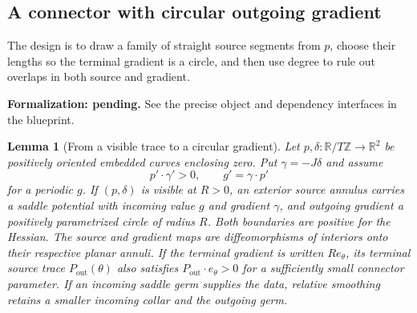 \documentclass[11pt]{amsart}
\newtheorem{lemma}[theorem]{Lemma}
\theoremstyle{definition}
\theoremstyle{remark}
\newcommand{\R}{\mathbb R}\newcommand{\Sph}{\mathbb S}
\numberwithin{equation}{section}
\begin{document}
\subsection{A connector with circular outgoing gradient}
The design is to draw a family of straight source segments from $p$,
choose their lengths so the terminal gradient is a circle, and then use
degree to rule out overlaps in both source and gradient.
\par\noindent\textbf{Formalization: pending.} See the precise object and dependency interfaces in the blueprint.\par
\begin{lemma}[From a visible trace to a circular gradient]\label{lem:connector}
Let $p,\delta:\R/T\mathbb Z\to\R^2$ be positively oriented embedded
curves enclosing zero. Put $\gamma=-J\delta$ and assume
\begin{equation}\label{eq:connector-data}
 p'\cdot\gamma'>0,\qquad g'=\gamma\cdot p'
\end{equation}
for a periodic $g$. If $(p,\delta)$ is visible at $R>0$, an exterior
source annulus carries a saddle potential with incoming value $g$ and
gradient $\gamma$, and outgoing gradient a positively parametrized
circle of radius $R$. Both boundaries are positive for the Hessian.
The source and gradient maps are diffeomorphisms of interiors onto their
respective planar annuli. If the terminal gradient is written
$Re_\theta$, its terminal source trace $P_\mathrm{out}(\theta)$ also
satisfies $P_\mathrm{out}\cdot e_\theta>0$ for a sufficiently small
connector parameter. If an incoming saddle germ supplies the data,
relative smoothing retains a smaller incoming collar and the outgoing germ.
\end{lemma}
\end{document}
